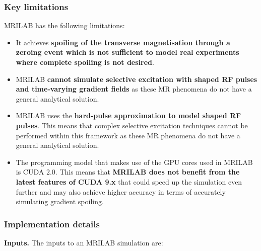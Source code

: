 \subsubsection{Key limitations}
MRILAB has the following limitations:
\begin{itemize}
    
    \item It achieves \textbf{spoiling of the transverse magnetisation through a zeroing event which is not sufficient to model real experiments where complete spoiling is not desired}.
    
    \item MRILAB \textbf{cannot simulate selective excitation with shaped RF pulses and time-varying gradient fields} as these MR phenomena do not have a general analytical solution.
    
    \item MRILAB uses the \textbf{hard-pulse approximation to model shaped RF pulses}.
    This means that complex selective excitation techniques cannot be performed within this framework as these MR phenomena do not have a general analytical solution.
    
    \item The programming model that makes use of the GPU cores used in MRILAB is CUDA 2.0.
    This means that \textbf{MRILAB does not benefit from the latest features of CUDA 9.x} that could speed up the simulation even further and may also achieve higher accuracy in terms of accurately simulating gradient spoiling.
    
\end{itemize}

\hfill

\subsubsection{Implementation details}

\textbf{Inputs.} The inputs to an MRILAB simulation are:

